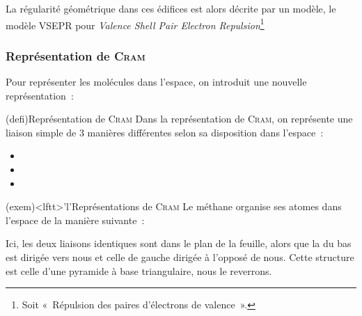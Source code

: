 \documentclass[../../main/main.tex]{subfiles}
\begin{document}
La régularité géométrique dans ces édifices est alors décrite par un modèle, le
modèle VSEPR pour \textit{Valence Shell Pair Electron Repulsion}\footnote{Soit
	«~Répulsion des paires d'électrons de valence~».}

\subsubsection{Représentation de \textsc{Cram}}
Pour représenter les molécules dans l'espace, on introduit une nouvelle
représentation~:
\begin{tcb*}[breakable](defi){Représentation de \textsc{Cram}}
	Dans la représentation de \textsc{Cram}, on représente une liaison simple de
	3 manières différentes selon sa disposition dans l'espace~:
	\begin{itemize}
		\item {}
		\item {}
		\item {}
	\end{itemize}
\end{tcb*}

\begin{tcb*}(exem)<lftt>'l'{Représentations de \textsc{Cram}}
	Le méthane  organise ses atomes dans l'espace de la manière
	suivante~:
	\begin{center}
	\end{center}
	Ici, les deux liaisons  identiques sont dans le plan de la feuille,
	alors que la  du bas est dirigée vers nous et celle de gauche
	dirigée à l'opposé de nous. Cette structure est celle d'une pyramide à base
	triangulaire, nous le reverrons.
\end{tcb*}
\end{document}
